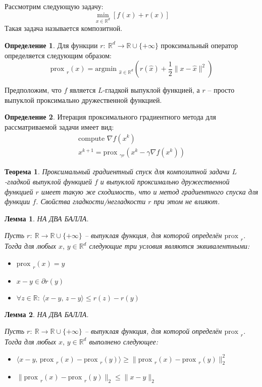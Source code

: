 \documentclass[a4paper,12pt]{article}
\renewcommand{\leq}{\ensuremath{\leqslant}}
\renewcommand{\geq}{\ensuremath{\geqslant}}
\theoremstyle{plain}
\newtheorem{theorem}{Теорема}[section]
\newtheorem{lemma}{Лемма}[section]
\theoremstyle{definition}
\newtheorem{definition}{Определение}[section]
\theoremstyle{remark}
\begin{document}
Рассмотрим следующую задачу:
\[
  \min_{x \in \mathbb{R}^d}[f(x) + r(x)]
\]
Такая задача называется композитной. 

\begin{definition}
  Для функции $r :\: \mathbb{R}^d \to \mathbb{R}\cup \{+\infty\}$ проксимальный оператор определяется следующим образом:
  \[
    \text{prox }_r(x) = \text{argmin }_{\hat{x} \in \mathbb{R}^d}\left(r(\hat{x}) + \frac{1}{2}\|x - \hat{x}\|^2\right)
  \]
\end{definition}

Предположим, что $f$ является $L$-гладкой выпуклой функцией, а $r$ -- просто выпуклой проксимально дружественной функцией.

\begin{definition}
  Итерация проксимального градиентного метода для рассматриваемой задачи имеет вид:
  \begin{align*}
    \text{compute }\nabla f(x^k)\\
    x^{k + 1} = \text{prox }_{\gamma r}(x^k - \gamma\nabla f(x^k))
  \end{align*}
\end{definition}

\begin{theorem}
  Проксимальный градиентный спуск для композитной задачи $L$-гладкой выпуклой функцией $f$ и выпуклой проксимально дружественной функцией $r$ имеет такую же сходимость, что и метод градиентного спуска для функции $f$. Свойства гладкости/негладкости $r$ при этом не влияют.
\end{theorem}

\begin{lemma}
  НА ДВА БАЛЛА.

  Пусть $r :\: \mathbb{R} \to \mathbb{R} \cup \{+\infty\}$ -- выпуклая функция, для которой определён $\text{prox }_r$. Тогда для любых $x,\, y \in \mathbb{R}^d$ следующие три условия являются эквивалентными:
  \begin{itemize}
    \item $\text{prox }_r(x) = y$
    \item $x - y \in \partial r(y)$
    \item $\forall z \in \mathbb{R} :\: \langle x - y,\, z - y\rangle \leq r(z) - r(y)$
  \end{itemize}
\end{lemma}

\begin{lemma}
  НА ДВА БАЛЛА.

  Пусть $r :\: \mathbb{R} \to \mathbb{R} \cup \{+\infty\}$ -- выпуклая функция, для которой определён $\text{prox }_r$. Тогда для любых $x,\, y \in \mathbb{R}^d$ выполнено следующее:
  \begin{itemize}
    \item $\langle x - y,\, \text{prox }_r(x) - \text{prox }_r(y)\rangle \geq \|\text{prox }_r(x) - \text{prox }_r(y)\|_2^2$
    \item $\|\text{prox }_r(x) - \text{prox }_r(y)\|_2 \leq \|x - y\|_2$
  \end{itemize}
\end{lemma}
\end{document}
